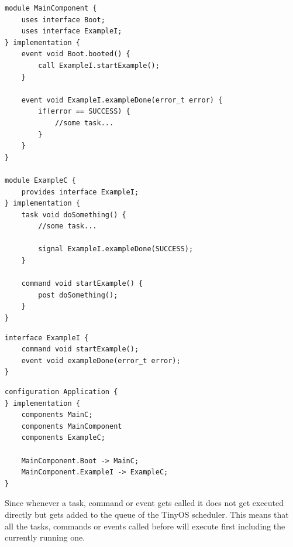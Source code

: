 \begin{lstlisting}
module MainComponent {
	uses interface Boot;
	uses interface ExampleI;
} implementation {
	event void Boot.booted() {
		call ExampleI.startExample();
	}
	
	event void ExampleI.exampleDone(error_t error) {
		if(error == SUCCESS) {
			//some task...
		}
	}
}

module ExampleC {
	provides interface ExampleI;
} implementation {
	task void doSomething() {
		//some task...
		
		signal ExampleI.exampleDone(SUCCESS);
	}
	
	command void startExample() {
		post doSomething();
	}
}
\end{lstlisting}


\begin{lstlisting}
interface ExampleI {
	command void startExample();
	event void exampleDone(error_t error);
}
\end{lstlisting}

\begin{lstlisting}
configuration Application {
} implementation {
	components MainC;
	components MainComponent
	components ExampleC;
		
	MainComponent.Boot -> MainC;
	MainComponent.ExampleI -> ExampleC;
}
\end{lstlisting} 

Since whenever a task, command or event gets called it does not get executed directly but gets added to the queue of the TinyOS scheduler. This means that all the tasks, commands or events called before will execute first including the currently running one. 